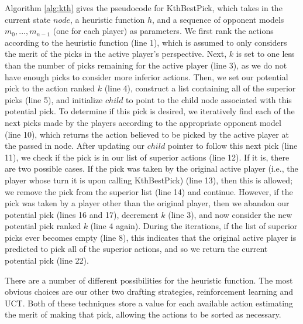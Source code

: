 \documentclass[letterpaper]{article}
\numberwithin{equation}{section}
\numberwithin{theorem}{section}
\numberwithin{lemma}{section}
\numberwithin{df}{section}
\begin{document}
Algorithm \ref{alg:kth} gives the pseudocode for KthBestPick, which takes in the current state $node$, a heuristic function $h$, and a sequence of opponent models $m_0, ..., m_{n-1}$ (one for each player) as parameters.  We first rank the actions according to the heuristic function (line 1), which is assumed to only considers the merit of the picks in the active player's perspective.  Next, $k$ is set to one less than the number of picks remaining for the active player (line 3), as we do not have enough picks to consider more inferior actions.  Then, we set our potential pick to the action ranked $k$ (line 4), construct a list containing all of the superior picks (line 5), and initialize $child$ to point to the child node associated with this potential pick.  To determine if this pick is desired, we iteratively find each of the next picks made by the players according to the appropriate opponent model (line 10), which returns the action believed to be picked by the active player at the passed in node.  After updating our $child$ pointer to follow this next pick (line 11), we check if the pick is in our list of superior actions (line 12).  If it is, there are two possible cases.  If the pick was taken by the original active player (i.e., the player whose turn it is upon calling KthBestPick) (line 13), then this is allowed; we remove the pick from the superior list (line 14) and continue.  However, if the pick was taken by a player other than the original player, then we abandon our potential pick (lines 16 and 17), decrement $k$ (line 3), and now consider the new potential pick ranked $k$ (line 4 again).  During the iterations, if the list of superior picks ever becomes empty (line 8), this indicates that the original active player is predicted to pick all of the superior actions, and so we return the current potential pick (line 22).

There are a number of different possibilities for the heuristic function.  The most obvious choices are our other two drafting strategies, reinforcement learning and UCT.  Both of these techniques store a value for each available action estimating the merit of making that pick, allowing the actions to be sorted as necessary.
\end{document}

